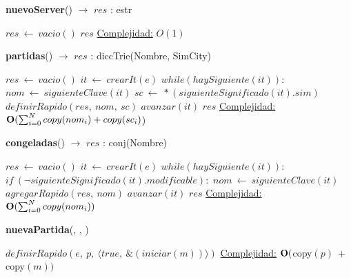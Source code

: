 \begin{Algoritmos}

    \begin{algorithm}[H]{\textbf{nuevoServer}() $\to$ $res$ : estr}
        \begin{algorithmic}[1]
            \State $res\ \gets\ vacio()$
            \State \Return $res$
            \medskip
            \Statex \underline{Complejidad:} $O(1)$
        \end{algorithmic}
    \end{algorithm}

    \begin{algorithm}[H]{\textbf{partidas}() $\to$ $res$ : diccTrie(Nombre, SimCity)}
        \begin{algorithmic}[1]
            \State $res\ \gets\ vacio()$
            \State $it\ \gets\ crearIt(e)$
            \State $while(haySiguiente(it)):$
            \State \indent $nom\ \gets\ siguienteClave(it)$
            \State \indent $sc\ \gets\ *(siguienteSignificado(it).sim)$
            \State \indent $definirRapido(res,\ nom,\ sc)$
            \State \indent $avanzar(it)$ 
            \State \Return $res$
            \medskip
            \Statex \underline{Complejidad:} $\bold{O}(\sum_{i = 0}^{N}{copy(nom_i) + copy(sc_i)}$)
        \end{algorithmic}
    \end{algorithm}

    \begin{algorithm}[H]{\textbf{congeladas}() $\to$ $res$ : conj(Nombre)}
        \begin{algorithmic}[1]
            \State $res\ \gets\ vacio()$
            \State $it\ \gets\ crearIt(e)$
            \State $while(haySiguiente(it)):$
            \State \indent $if\ (\neg siguienteSignificado(it).modificable):$
            \State \indent \indent $nom\ \gets\ siguienteClave(it)$
            \State \indent \indent $agregarRapido(res,\ nom)$
            \State \indent $avanzar(it)$ 
            \State \Return $res$
            \medskip
            \Statex \underline{Complejidad:} $\bold{O}(\sum_{i = 0}^{N}{copy(nom_i)})$
        \end{algorithmic}
    \end{algorithm}

    \begin{algorithm}[H]{\textbf{nuevaPartida}(, , )}
        \begin{algorithmic}[1]
            \State $definirRapido(e,\ p,\ \langle true,\ \&(iniciar(m))\rangle )$ 
            \medskip
            \Statex \underline{Complejidad:} $\bold{O}($copy$(p)\ +\ $copy$(m))$
        \end{algorithmic}
    \end{algorithm}


\end{Algoritmos}
